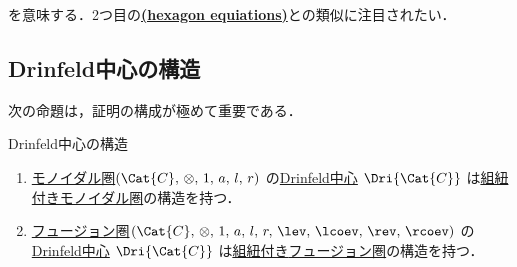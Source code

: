 \documentclass[TQFT_main]{subfiles}
\begin{document}
を意味する．2つ目の\hyperref[redef:braided-monoidal]{\textsf{\textbf{(hexagon equiations)}}}との類似に注目されたい．

\subsection{Drinfeld中心の構造}


次の命題は，証明の構成が極めて重要である．

\begin{myprop}[label=prop:Drinfeld-center]{Drinfeld中心の構造}
    \begin{enumerate}
        \item \hyperref[redef:monoidal-category]{モノイダル圏}$(\Cat{C},\, \otimes,\, 1,\, a,\, l,\, r)$ の\hyperref[def:Drinfeld-center]{Drinfeld中心} $\Dri{\Cat{C}}$ は\hyperref[redef:braided-monoidal]{組紐付きモノイダル圏}の構造を持つ．
        \item \hyperref[def:tensorfusion-cat]{フュージョン圏}$(\Cat{C},\, \otimes,\, 1,\, a,\, l,\, r,\, \lev,\, \lcoev,\, \rev,\, \rcoev)$ の\hyperref[def:Drinfeld-center]{Drinfeld中心} $\Dri{\Cat{C}}$ は\hyperref[redef:braided-monoidal]{組紐付き}\hyperref[def:tensorfusion-cat]{フュージョン圏}の構造を持つ．
    \end{enumerate}
\end{myprop}
\end{document}
